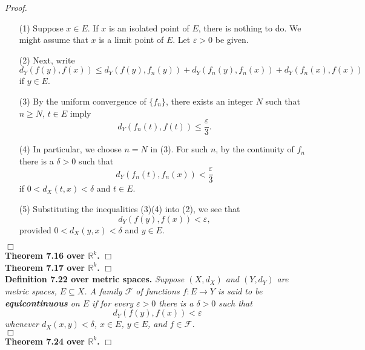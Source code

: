 \documentclass{article}
\begin{document}
\emph{Proof.}
\begin{enumerate}
\item[(1)]
  Suppose $x \in E$.
  If $x$ is an isolated point of $E$, there is nothing to do.
  We might assume that $x$ is a limit point of $E$.
  Let $\varepsilon > 0$ be given.

\item[(2)]
  Next, write
  \[
    d_Y(f(y),f(x))
    \leq
    d_Y(f(y),f_n(y)) + d_Y(f_n(y),f_n(x)) + d_Y(f_n(x),f(x))
  \]
  if $y \in E$.

\item[(3)]
  By the uniform convergence of $\{f_n\}$, there exists an integer $N$
  such that $n \geq N$, $t \in E$ imply
  \[
    d_Y(f_n(t),f(t)) \leq \frac{\varepsilon}{3}.
  \]

\item[(4)]
  In particular, we choose $n = N$ in (3).
  For such $n$, by the continuity of $f_n$
  there is a $\delta > 0$ such that
  \[
    d_Y(f_n(t),f_n(x)) < \frac{\varepsilon}{3}
  \]
  if $0 < d_X(t,x) < \delta$ and $t \in E$.

\item[(5)]
  Substituting the inequalities (3)(4) into (2), we see that
  \[
    d_Y(f(y),f(x)) < \varepsilon,
  \]
  provided $0 < d_X(y,x) < \delta$ and $y \in E$.
\end{enumerate}
$\Box$ \\



\textbf{Theorem 7.16 over $\mathbb{R}^k$.}
$\Box$ \\



\textbf{Theorem 7.17 over $\mathbb{R}^k$.}
$\Box$ \\



\textbf{Definition 7.22 over metric spaces.}
\emph{Suppose $(X,d_X)$ and $(Y,d_Y)$ are metric spaces, $E \subseteq X$.
A family $\mathscr{F}$ of functions $f: E \to Y$ is
said to be \textbf{equicontinuous} on $E$
if for every $\varepsilon > 0$ there is a $\delta > 0$ such that
\[
  d_Y(f(y),f(x)) < \varepsilon
\]
whenever $d_X(x,y) < \delta$, $x \in E$, $y \in E$, and $f \in \mathscr{F}$.} \\
$\Box$ \\



\textbf{Theorem 7.24 over $\mathbb{R}^k$.}
$\Box$ \\
\end{document}
